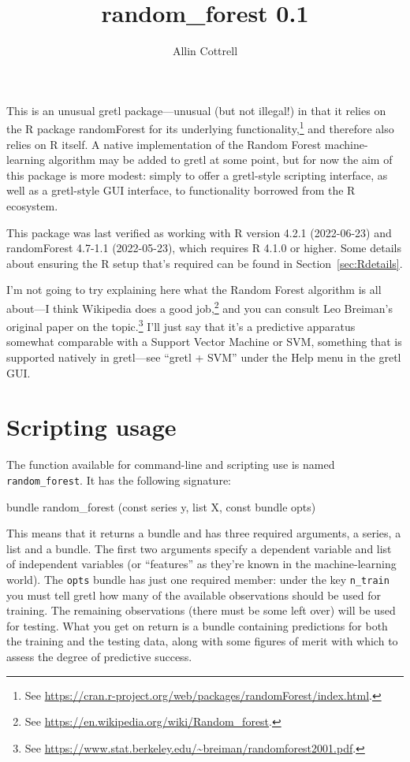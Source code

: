 \documentclass{article}
\begin{document}
\setlength{\parindent}{0pt}
\setlength{\parskip}{1ex}

\title{random\_forest 0.1} \author{Allin Cottrell}
\maketitle

This is an unusual gretl package---unusual (but not illegal!) in that
it relies on the \textsf{R} package \textsf{randomForest} for its
underlying functionality,\footnote{See
  \url{https://cran.r-project.org/web/packages/randomForest/index.html}.}
and therefore also relies on \textsf{R} itself. A native
implementation of the Random Forest machine-learning algorithm may be
added to gretl at some point, but for now the aim of this package is
more modest: simply to offer a gretl-style scripting interface, as
well as a gretl-style GUI interface, to functionality borrowed from
the \textsf{R} ecosystem.

This package was last verified as working with \textsf{R} version
4.2.1 (2022-06-23) and \textsf{randomForest} 4.7-1.1 (2022-05-23),
which requires \textsf{R} 4.1.0 or higher. Some details about ensuring
the \textsf{R} setup that's required can be found in
Section~\ref{sec:Rdetails}.

I'm not going to try explaining here what the Random Forest algorithm
is all about---I think Wikipedia does a good job,\footnote{See
  \url{https://en.wikipedia.org/wiki/Random_forest}.} and you can
consult Leo Breiman's original paper on the topic.\footnote{See
  \url{https://www.stat.berkeley.edu/~breiman/randomforest2001.pdf}.}
I'll just say that it's a predictive apparatus somewhat comparable
with a Support Vector Machine or SVM, something that is supported
natively in gretl---see ``gretl + SVM'' under the \textsf{Help} menu
in the gretl GUI.

\section{Scripting usage}

The function available for command-line and scripting use is named
\texttt{random\_forest}. It has the following signature:
%
\begin{code}
bundle random_forest (const series y, list X, const bundle opts)
\end{code}
%
This means that it returns a bundle and has three required arguments,
a series, a list and a bundle. The first two arguments specify a
dependent variable and list of independent variables (or ``features''
as they're known in the machine-learning world). The \texttt{opts}
bundle has just one required member: under the key \texttt{n\_train}
you must tell gretl how many of the available observations should be
used for training.  The remaining observations (there must be some
left over) will be used for testing. What you get on return is a
bundle containing predictions for both the training and the testing
data, along with some figures of merit with which to assess the degree
of predictive success.
\end{document}
